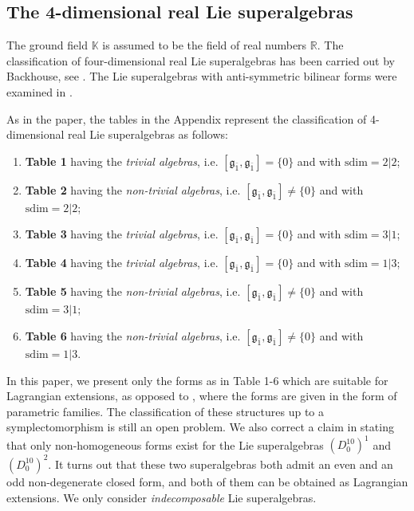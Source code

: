 \documentclass[12pt]{amsart}
\newtheorem{Theorem}{Theorem}[section]
\begin{document}
\subsection{The 4-dimensional real Lie superalgebras}
The ground field $\mathbb K$ is assumed to be the field of real numbers $\mathbb R$. The classification of four-dimensional real Lie superalgebras has been carried out by Backhouse, see \cite{B}. The Lie superalgebras with anti-symmetric bilinear forms were examined in \cite{BM}. %

%
 

As in the \cite{BM} paper, the tables in the Appendix represent the classification of 4-dimensional real Lie superalgebras as follows:
\begin{enumerate}
    \item \textbf{Table 1} having the {\it trivial algebras}, i.e.  $[\mathfrak{g_{\bar{1}}},\mathfrak{g_{\bar{1}}}]=\{0\}$ and with  $\mathrm{sdim} = 2|2$;
    \item \textbf{Table 2} having the {\it non-trivial algebras}, i.e. $[\mathfrak{g_{\bar{1}}},\mathfrak{g_{\bar{1}}}]\not = \{0\}$ and  with $\mathrm{sdim} = 2|2$;
    \item \textbf{Table 3} having the {\it trivial algebras}, i.e.  $[\mathfrak{g_{\bar{1}}},\mathfrak{g_{\bar{1}}}]=\{0\}$ and with $\mathrm{sdim} = 3|1$; 
    \item \textbf{Table 4} having the {\it trivial algebras}, i.e.  $[\mathfrak{g_{\bar{1}}},\mathfrak{g_{\bar{1}}}]= \{0\}$ and with $\mathrm{sdim} = 1|3$; 
    \item \textbf{Table 5} having the {\it non-trivial algebras}, i.e. $[\mathfrak{g_{\bar{1}}},\mathfrak{g_{\bar{1}}}] \not = \{0\}$ and  with $\mathrm{sdim} = 3|1$; 
    \item \textbf{Table 6} having the {\it non-trivial algebras}, i.e. $[\mathfrak{g_{\bar{1}}},\mathfrak{g_{\bar{1}}}]\not = \{0\}$ and with $\mathrm{sdim} = 1|3$.
\end{enumerate}
In this paper, we present only the forms as in Table 1-6 which are suitable for Lagrangian extensions, as opposed to \cite{BM}, where the forms are given in the form of parametric families. The classification of these structures up to a symplectomorphism is still an open problem. We also correct a claim in \cite{BM} stating that only non-homogeneous forms exist for the Lie superalgebras $(D_0^{10})^1$ and $(D_0^{10})^2$. It turns out that these two superalgebras both admit an even and an odd non-degenerate closed form, and both of them can be obtained as Lagrangian extensions. We only consider \emph{indecomposable} Lie superalgebras.
\end{document}
